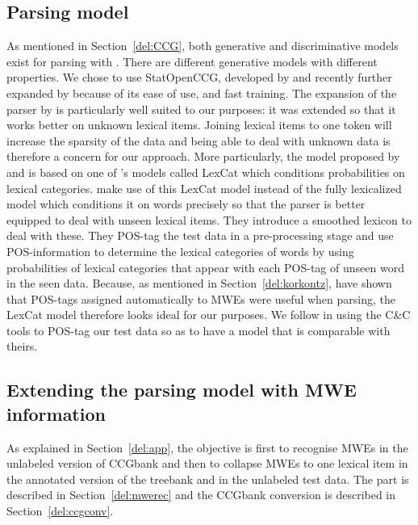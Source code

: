 \documentclass[output=paper]{langsci/langscibook}
\begin{document}
\subsection{Parsing model}
\label{del:parsingmodel}
\indent As mentioned in Section~\ref{del:CCG}, both generative and discriminative models exist for parsing with . There are different generative models with different properties. We chose to use StatOpenCCG, developed by \citet{christodoulopoulos2008} and recently further expanded by \citet{deoskar} because of its ease of use,  and fast training. The expansion of the parser by \citet{deoskar} is particularly well suited to our purposes: it was extended so that it works better on unknown lexical items. Joining lexical items to one token will increase the sparsity of the data and being able to deal with unknown data is therefore a concern for our approach. More particularly, the model proposed by \citet{christodoulopoulos2008} and \citet{deoskar} is based on one of \citet{hockenmaier2003}'s models called LexCat which conditions probabilities on lexical categories. \citet{deoskar} make use of this LexCat model instead of the fully lexicalized model which conditions it on words precisely so that the parser is better equipped to deal with unseen lexical items. They introduce a smoothed lexicon to deal with these. They POS-tag the test data in a pre-processing stage and use POS-information to determine the lexical categories of words by using probabilities of lexical categories that appear with each POS-tag of unseen word in the seen data. Because, as mentioned in Section~\ref{del:korkontz}, \citet{korkontzelosetal2010} have shown that POS-tags assigned automatically to MWEs were useful when parsing, the LexCat model therefore looks ideal for our purposes. We follow \citet{deoskar} in using the C\&C tools \citep{cctools} to POS-tag our test data so as to have a model that is comparable with theirs.

\subsection{Extending the parsing model with MWE information}
\label{del:extension}

\indent As explained in Section~\ref{del:app}, the objective is first to recognise MWEs in the unlabeled version of CCGbank and then to collapse MWEs to one lexical item in the annotated version of the treebank and in the unlabeled test data. The  part is described in Section~\ref{del:mwerec} and the CCGbank conversion is described in Section~\ref{del:ccgconv}. 
\end{document}
